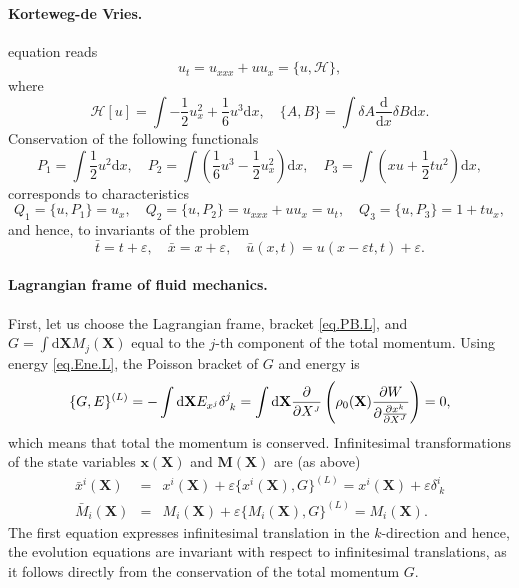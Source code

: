 \documentclass[
10pt, %
a4paper, %
oneside, %
headinclude,footinclude, %
BCOR5mm, %
]{scrartcl}
\newcommand{\xx}{\mathbf{x}}
\newcommand{\XX}{\mathbf{X}}
\newcommand{\dX}{\mathrm{d}\XX}
\newcommand{\MM}{\mathbf{M}}
\newcommand{\eps}{\varepsilon}
\newcommand{\sJ}{{\mathsmaller J}}
\newcommand{\Gfunc}{G}
\begin{document}
\paragraph{Korteweg-de Vries.} equation reads
\begin{equation}
    u_t = u_{xxx}+u u_x = \{u,\mathcal{H}\}, 
\end{equation}
where
\begin{equation*}
    \mathcal{H}[u] = \int -\frac 1 2 u_x^2+ \frac 1 6 u^3 \mathrm{d} x,\quad \{A,B\} = \int \delta A \frac{\mathrm{d}}{\mathrm{d}x} \delta B \mathrm{d}x.
\end{equation*}
Conservation of the following functionals
\begin{equation*}
    P_1 = \int \frac 1 2 u^2 \mathrm{d} x,\quad P_2 = \int (\frac 1 6 u^3 - \frac 1 2 u_x^2) \mathrm{d} x, \quad P_3 = \int(xu+\frac 1 2 t u^2) \mathrm{d}x,
\end{equation*}
corresponds to characteristics
\begin{equation*}
    Q_1 = \{u,P_1\} = u_x,\quad Q_2 = \{u,P_2\} = u_{xxx}+ u u_x = u_t, \quad Q_3 = \{u,P_3\} = 1 + t u_x,
\end{equation*}
and hence, to invariants of the problem
\begin{equation*}
	\bar{t} = t + \varepsilon,
	\quad 
    \bar{x} = x + \varepsilon,
    \quad
    \bar{u}(x,t) = u(x-\varepsilon t,t) + \varepsilon. 
\end{equation*}

\paragraph{Lagrangian frame of fluid mechanics.}
First, let us choose the Lagrangian frame, bracket \eqref{eq.PB.L}, and 
$\Gfunc=\int\dX M_j(\XX)$ equal to the $ j $-th component of the total momentum. Using energy 
\eqref{eq.Ene.L}, the Poisson bracket of $\Gfunc$ and energy is
\begin{equation}
    \{\Gfunc, E\}^{(L)} = -\int\dX E_{x^j} \delta^j_{\ k} = \int\dX 
    \frac{\partial}{\partial X^\sJ} \left(\rho_0(\XX) \frac{\partial W}{\partial 
    \frac{\partial x^k}{\partial X^\sJ}}\right) = 0,
\end{equation}
which means that total the momentum is conserved. Infinitesimal transformations of the state 
variables $\xx(\XX)$ and $\MM(\XX)$ are (as above)
\begin{subequations}
\begin{eqnarray}
    \bar{x}^i(\XX) &=& x^i(\XX) + \eps \{x^i(\XX),\Gfunc\}^{(L)} = x^i(\XX) 
    +\eps \delta^i_{\ k}\\
    \bar{M}_i(\XX) &=& M_i(\XX) + \eps \{M_i(\XX),\Gfunc\}^{(L)} = M_i(\XX).
\end{eqnarray}
\end{subequations}
The first equation expresses infinitesimal translation in the $k$-direction and 
hence, the evolution equations are invariant with respect to infinitesimal 
translations, as it follows directly from the conservation of the total momentum 
$\Gfunc$.
\end{document}
